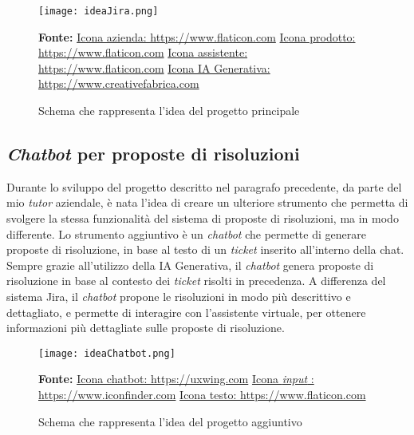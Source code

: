 \begin{figure}[H]
    \centering
    \texttt{[image: ideaJira.png]}
    \caption{Schema che rappresenta l'idea del progetto principale}
    \small \textbf{Fonte:} \href{https://www.flaticon.com/free-icon/company_4812244}{Icona azienda: https://www.flaticon.com} \href{https://www.flaticon.com/free-icon/box_4601560}{Icona prodotto: https://www.flaticon.com} \href{https://www.flaticon.com/free-icon/assistant_1442194}{Icona assistente: https://www.flaticon.com} \href{https://www.creativefabrica.com/it/product/ai-brain-outline-icon/} {Icona IA Generativa: https://www.creativefabrica.com}

    \label{fig:ideaJira}
\end{figure}
\subsection{\textit{Chatbot} per proposte di risoluzioni}
Durante lo sviluppo del progetto descritto nel paragrafo precedente, da parte del mio \textit{tutor} aziendale, è nata l'idea di creare un ulteriore strumento che permetta di svolgere la stessa funzionalità del sistema di proposte di risoluzioni, ma in modo differente. Lo strumento aggiuntivo è un \textit{chatbot} che permette di generare proposte di risoluzione, in base al testo di un \textit{ticket} inserito all'interno della chat. 
Sempre grazie all'utilizzo della IA Generativa, il \textit{chatbot} genera proposte di risoluzione in base al contesto dei \textit{ticket} risolti in precedenza. A differenza del sistema Jira, il \textit{chatbot} propone le risoluzioni in modo più descrittivo e dettagliato, e permette di interagire con l'assistente virtuale, per ottenere informazioni più dettagliate sulle proposte di risoluzione.
\begin{figure}[H]
    \centering
    \texttt{[image: ideaChatbot.png]}
    \caption{Schema che rappresenta l'idea del progetto aggiuntivo}
    \label{fig:ideaChatbot}
    \small \textbf{Fonte:} \href{https://uxwing.com/chatbot-icon/}{Icona chatbot: https://uxwing.com} \href{https://www.iconfinder.com/icons/351012/field_input_search_icon}{Icona \textit{input} : https://www.iconfinder.com} \href{https://www.flaticon.com/free-icon/text-file_5116156} {Icona testo: https://www.flaticon.com}

\end{figure}

